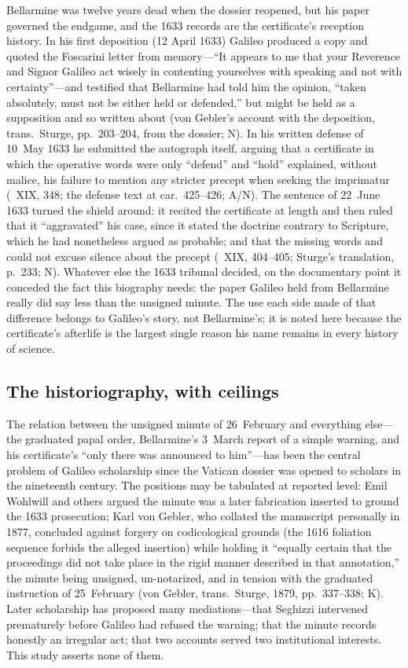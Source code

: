 Bellarmine was twelve years dead when the dossier reopened, but
his paper governed the endgame, and the 1633 records are the
certificate's reception history. In his first deposition (12
April 1633) Galileo produced a copy and quoted the Foscarini
letter from memory---``It appears to me that your Reverence and
Signor Galileo act wisely in contenting yourselves with speaking
 and not with certainty''---and testified
that Bellarmine had told him the opinion, ``taken absolutely,
must not be either held or defended,'' but might be held as a
supposition and so written about (von Gebler's account with the
deposition, trans.\ Sturge, pp.~203--204, from the dossier; N).
In his written defense of 10~May 1633 he submitted the autograph
itself, arguing that a certificate in which the operative words
were only ``defend'' and ``hold'' explained, without malice, his
failure to mention any stricter precept when seeking the
imprimatur (~XIX, 348; the defense text at
car.~425--426; A/N). The sentence of 22~June 1633 turned the
shield around: it recited the certificate at length and then
ruled that it ``aggravated'' his case, since it stated the
doctrine contrary to Scripture, which he had nonetheless argued
as probable; and that the missing words  and
 could not excuse silence about the precept
(~XIX, 404--405; Sturge's translation, p.~233; N).
Whatever else the 1633 tribunal decided, on the documentary
point it conceded the fact this biography needs: the paper
Galileo held from Bellarmine really did say less than the
unsigned minute. The use each side made of that difference
belongs to Galileo's story, not Bellarmine's; it is noted here
because the certificate's afterlife is the largest single reason
his name remains in every history of science.

\subsection{The historiography, with ceilings}

The relation between the unsigned minute of 26~February and
everything else---the graduated papal order, Bellarmine's 3~March
report of a simple warning, and his certificate's ``only there
was announced to him''---has been the central problem of Galileo
scholarship since the Vatican dossier was opened to scholars in
the nineteenth century. The positions may be tabulated at
reported level: Emil Wohlwill and others argued the minute was a
later fabrication inserted to ground the 1633 prosecution; Karl
von Gebler, who collated the manuscript personally in 1877,
concluded against forgery on codicological grounds (the 1616
foliation sequence forbids the alleged insertion) while holding
it ``equally certain that the proceedings did not take place in
the rigid manner described in that annotation,'' the minute being
unsigned, un-notarized, and in tension with the graduated
instruction of 25~February (von Gebler, trans.\ Sturge, 1879,
pp.~337--338; K). Later scholarship has proposed many
mediations---that Seghizzi intervened prematurely before Galileo
had refused the warning; that the minute records honestly an
irregular act; that two accounts served two institutional
interests. This study asserts none of them.


